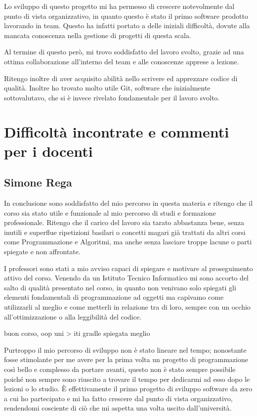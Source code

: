 \documentclass[a4paper,12pt]{report}
\begin{document}
Lo sviluppo di questo progetto mi ha permesso di crescere notevolmente dal punto di vista organizzativo, in quanto questo è stato il primo software prodotto lavorando in team. Questo ha infatti portato a delle iniziali difficoltà, dovute alla mancata conoscenza nella gestione di progetti di questa scala. 

Al termine di questo però, mi trovo soddisfatto del lavoro svolto, grazie ad una ottima collaborazione all’interno del team e alle conoscenze apprese a lezione.

Ritengo inoltre di aver acquisito abilità nello scrivere ed apprezzare codice di qualità.
Inoltre ho trovato molto utile Git, software che inizialmente sottovalutavo, che si è invece rivelato fondamentale per il lavoro svolto.


\section{Difficoltà incontrate e commenti per i docenti}

\subsection{Simone Rega}
In conclusione sono soddisfatto del mio percorso in questa materia e ritengo che il corso sia stato utile e funzionale al mio percorso di studi e formazione professionale. Ritengo che il carico del lavoro sia tarato abbastanza bene, senza inutili e superflue ripetizioni basilari o concetti magari già trattati da altri corsi come Programmazione e Algoritmi, ma anche senza lasciare troppe lacune o parti spiegate e non affrontate. 

I professori sono stati a mio avviso capaci di spiegare e motivare al proseguimento attivo del corso.
Venendo da un Istituto Tecnico Informatico mi sono accorto del salto di qualità presentato nel corso, in quanto non venivano solo spiegati gli elementi fondamentali di programmazione ad oggetti ma capivamo come utilizzarli al meglio e come metterli in relazione tra di loro, sempre con un occhio all'ottimizzazione o alla leggibilità del codice.

buon corso, oop uni > iti
gradle spiegata meglio

Purtroppo il mio percorso di sviluppo non è stato lineare nel tempo; nonostante fosse stimolante per me avere per la prima volta un progetto di programmazione così bello e complesso da portare avanti, questo non è stato sempre possibile poiché non sempre sono riuscito a trovare il tempo per dedicarmi ad esso dopo le lezioni o lo studio. È effettivamente il primo progetto di sviluppo software da zero a cui ho partecipato e mi ha fatto crescere dal punto di vista organizzativo, rendendomi cosciente di ciò che mi aspetta una volta uscito dall'università.
\end{document}
